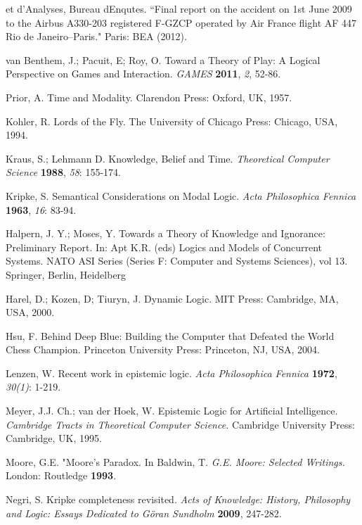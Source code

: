 \begin{thebibliography}{9}
	 	
	 	et d'Analyses, Bureau dEnqutes. ``Final report on the accident on 1st June 2009 to the Airbus A330-203 registered F-GZCP operated by Air France flight AF 447 Rio de Janeiro–Paris." Paris: BEA (2012).
	 	
	 	
	 	van Benthem, J.; Pacuit, E; Roy, O. Toward a Theory of Play: A Logical Perspective on Games and Interaction. {\em GAMES} {\bf 2011}, {\em 2}, 52-86.
	 	
	 	Prior, A. Time and Modality. Clarendon Press: Oxford, UK, 1957.
	 	
	 	Kohler, R. Lords of the Fly. The University of Chicago Press: Chicago, USA, 1994.
	 	
	 	Kraus, S.; Lehmann D. Knowledge, Belief and Time. {\em Theoretical Computer Science} {\bf 1988}, {\em 58}: 155-174.
	 	
	 	Kripke, S. Semantical Considerations on Modal Logic. {\em Acta Philosophica Fennica} {\bf 1963}, {\em 16}: 83-94.
	 	
	 	Halpern, J. Y.; Moses, Y.  Towards a Theory of Knowledge and Ignorance: Preliminary Report. In: Apt K.R. (eds) Logics and Models of Concurrent Systems. NATO ASI Series (Series F: Computer and Systems Sciences), vol 13. Springer, Berlin, Heidelberg
	 	
	 	Harel, D.; Kozen, D; Tiuryn, J. Dynamic Logic. MIT Press: Cambridge, MA, USA, 2000.
	 	
	 	Hsu, F. Behind Deep Blue: Building the Computer that Defeated the World Chess Champion. Princeton University Press: Princeton, NJ, USA, 2004.
	 	
	 	Lenzen, W. Recent work in epistemic logic. {\em Acta Philosophica Fennica} {\bf 1972}, {\em 30(1)}: 1-219.
	 	
	 	Meyer, J.J. Ch.; van der Hoek, W. Epistemic Logic for Artificial Intelligence. {\em Cambridge Tracts in Theoretical Computer Science.} Cambridge University Press: Cambridge, UK, 1995.
	 	
	 	Moore, G.E. "Moore's Paradox. In Baldwin, T. {\em G.E. Moore: Selected Writings.} London: Routledge {\bf 1993}.
	 	
	 	Negri, S. Kripke completeness revisited. {\em Acts of Knowledge: History, Philosophy and Logic: Essays Dedicated to G{\"o}ran Sundholm} {\bf 2009}, 247-282.
	 	

\end{thebibliography}
